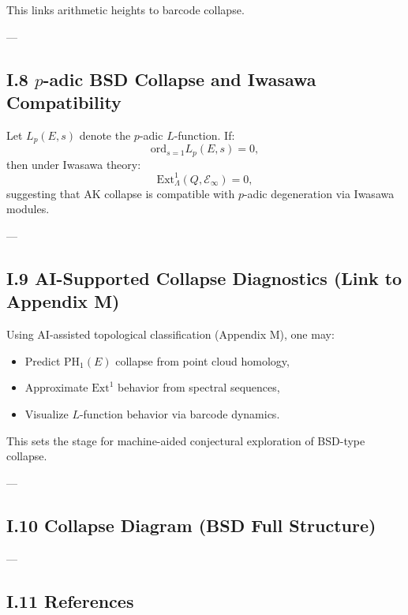 \documentclass[11pt]{article}
\newcommand{\Sha}{\mathbb{S}}
\begin{document}
This links arithmetic heights to barcode collapse.

---

\subsection*{I.8 $p$-adic BSD Collapse and Iwasawa Compatibility}

Let $L_p(E,s)$ denote the $p$-adic $L$-function.  
If:
\[
\mathrm{ord}_{s=1} L_p(E,s) = 0,
\]
then under Iwasawa theory:
\[
\mathrm{Ext}^1_{\Lambda}(Q, \mathcal{E}_\infty) = 0,
\]
suggesting that AK collapse is compatible with $p$-adic degeneration via Iwasawa modules.

---

\subsection*{I.9 AI-Supported Collapse Diagnostics (Link to Appendix M)}

Using AI-assisted topological classification (Appendix M), one may:
\begin{itemize}
  \item Predict $\mathrm{PH}_1(E)$ collapse from point cloud homology,
  \item Approximate $\mathrm{Ext}^1$ behavior from spectral sequences,
  \item Visualize $L$-function behavior via barcode dynamics.
\end{itemize}

This sets the stage for machine-aided conjectural exploration of BSD-type collapse.

---

\subsection*{I.10 Collapse Diagram (BSD Full Structure)}

\begin{center}
\end{center}

---

\subsection*{I.11 References}
\end{document}
